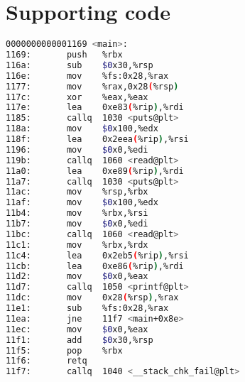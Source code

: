 \appendix

\chapter{Supporting code}
\label{chp:app:supporting-code}

\begin{lstlisting}[language=bash,float=ht,caption={Disassembly excerpt of the 64 bit binary compiled from the code in \cref{lst:local-global-buffer} with \texttt{gcc -o local-global-buffer -O1 local-global-\linebreak[0]buffer.c}, retrieved with \texttt{objdump -D -{}-no-show-raw-insn local-\linebreak[0]global-buffer}}, label={lst:local-global-buffer-disassembly-non-fortified}]
0000000000001169 <main>:
1169:       push   %rbx
116a:       sub    $0x30,%rsp
116e:       mov    %fs:0x28,%rax
1177:       mov    %rax,0x28(%rsp)
117c:       xor    %eax,%eax
117e:       lea    0xe83(%rip),%rdi
1185:       callq  1030 <puts@plt>
118a:       mov    $0x100,%edx
118f:       lea    0x2eea(%rip),%rsi
1196:       mov    $0x0,%edi
119b:       callq  1060 <read@plt>
11a0:       lea    0xe89(%rip),%rdi
11a7:       callq  1030 <puts@plt>
11ac:       mov    %rsp,%rbx
11af:       mov    $0x100,%edx
11b4:       mov    %rbx,%rsi
11b7:       mov    $0x0,%edi
11bc:       callq  1060 <read@plt>
11c1:       mov    %rbx,%rdx
11c4:       lea    0x2eb5(%rip),%rsi
11cb:       lea    0xe86(%rip),%rdi
11d2:       mov    $0x0,%eax
11d7:       callq  1050 <printf@plt>
11dc:       mov    0x28(%rsp),%rax
11e1:       sub    %fs:0x28,%rax
11ea:       jne    11f7 <main+0x8e>
11ec:       mov    $0x0,%eax
11f1:       add    $0x30,%rsp
11f5:       pop    %rbx
11f6:       retq
11f7:       callq  1040 <__stack_chk_fail@plt>
\end{lstlisting}

